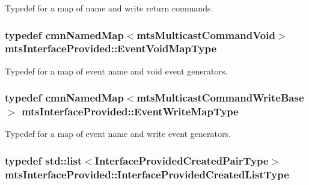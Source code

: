 Typedef for a map of name and write return commands. \hypertarget{classmts_interface_provided_a81dc5f40eef8155cfc0ddad74c5c1b6a}{
\subsubsection[{Event\-Void\-Map\-Type}]{\setlength{\rightskip}{0pt plus 5cm}typedef {\bf cmn\-Named\-Map}$<${\bf mts\-Multicast\-Command\-Void}$>$ {\bf mts\-Interface\-Provided\-::\-Event\-Void\-Map\-Type}}}\label{classmts_interface_provided_a81dc5f40eef8155cfc0ddad74c5c1b6a}
Typedef for a map of event name and void event generators. \hypertarget{classmts_interface_provided_a98f1388a3c2119a1ae97f19302eeb550}{
\subsubsection[{Event\-Write\-Map\-Type}]{\setlength{\rightskip}{0pt plus 5cm}typedef {\bf cmn\-Named\-Map}$<${\bf mts\-Multicast\-Command\-Write\-Base}$>$ {\bf mts\-Interface\-Provided\-::\-Event\-Write\-Map\-Type}}}\label{classmts_interface_provided_a98f1388a3c2119a1ae97f19302eeb550}
Typedef for a map of event name and write event generators. \hypertarget{classmts_interface_provided_ae16c05b551c38856866c199bc4551b98}{
\subsubsection[{Interface\-Provided\-Created\-List\-Type}]{\setlength{\rightskip}{0pt plus 5cm}typedef std\-::list$<${\bf Interface\-Provided\-Created\-Pair\-Type}$>$ {\bf mts\-Interface\-Provided\-::\-Interface\-Provided\-Created\-List\-Type}\hspace{0.3cm}{\ttfamily [protected]}}}\label{classmts_interface_provided_ae16c05b551c38856866c199bc4551b98}

